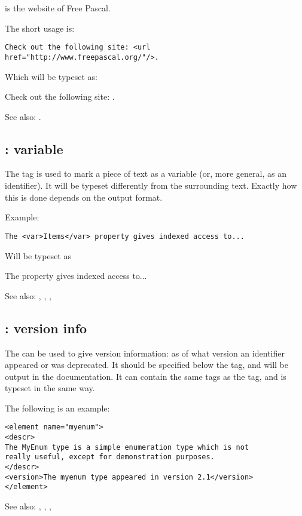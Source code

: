  is the website of Free Pascal.

The short usage is:
\begin{verbatim}
Check out the following site: <url href="http://www.freepascal.org/"/>.
\end{verbatim}
Which will be typeset as:

Check out the following site: .

See also: .

\subsection{ : variable}
\label{tag:var}
The  tag is used to mark a piece of text as a variable (or, more
general, as an identifier). It will be typeset differently from the 
surrounding text. Exactly how this is done depends on the output format.

Example:
\begin{verbatim}
The <var>Items</var> property gives indexed access to...
\end{verbatim}
Will be typeset as

The  property gives indexed access to...

See also: , , , 

\subsection{ : version info}
\label{tag:version}
The  can be used to give version information: as of what
version an identifier appeared or was deprecated. It should be specified
below the  tag, and will be output in the documentation.
It can contain the same tags as the  tag, and is typeset
in the same way.

The following is an example:
\begin{verbatim}
<element name="myenum">
<descr>
The MyEnum type is a simple enumeration type which is not
really useful, except for demonstration purposes.
</descr>
<version>The myenum type appeared in version 2.1</version>
</element>
\end{verbatim}
See also: , , , 


